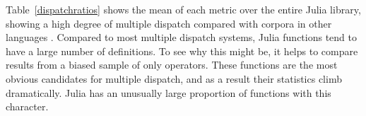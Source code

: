 Table~\ref{dispatchratios} shows the mean of each metric over the entire Julia
 library, showing a high degree of multiple dispatch compared with
corpora in other languages \cite{multipledispatch}.
Compared to most multiple dispatch systems, Julia functions tend to have a large
number of definitions.
To see why this might be, it helps to compare results from a biased sample of
only operators.
These functions are the most obvious candidates for multiple dispatch, and as
a result their statistics climb dramatically.
Julia has an unusually large proportion of functions with this character.
